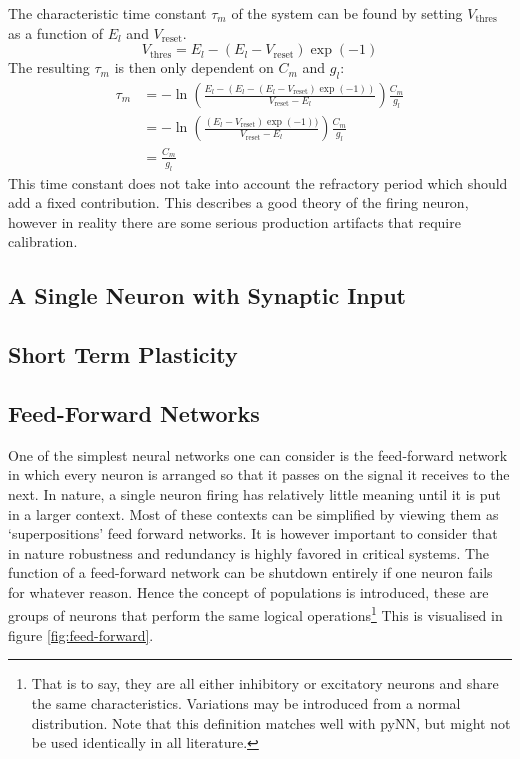\documentclass[10pt,a4paper]{article}
\begin{document}
The characteristic time constant $\tau_m$ of the system can be found by setting
$V_\text{thres}$ as a function of $E_l$ and $V_\text{reset}$.
\[
    V_\text{thres} = E_l - (E_l - V_\text{reset})\exp(-1)
\]
The resulting $\tau_m$ is then only dependent on $C_m$ and $g_l$:
\begin{align*}
    \tau_m &= -\ln(\frac{E_l - (E_l - (E_l - V_\text{reset})\exp(-1))}{V_\text{reset} - E_l}) \frac{C_m}{g_l}\\
           &= -\ln(\frac{(E_l - V_\text{reset})\exp(-1))}{V_\text{reset} - E_l})\frac{C_m}{g_l} \\
           &= \frac{C_m}{g_l}
\end{align*}
This time constant does not take into account the refractory period which should
add a fixed contribution. This describes a good theory of the firing  neuron,
however in reality there are some serious production artifacts that require
calibration.

\subsection{A Single Neuron with Synaptic Input}

\subsection{Short Term Plasticity}

\subsection{Feed-Forward Networks}
One of the simplest neural networks one can consider is the feed-forward network
in which every neuron is arranged so that it passes on the signal it receives to
the next. In nature, a single neuron firing has relatively little meaning until
it is put in a larger context. Most of these contexts can be simplified by
viewing them as `superpositions' feed forward networks. It is however important
to consider that in nature robustness and redundancy is highly favored in
critical systems. The function of a feed-forward network can be shutdown
entirely if one neuron fails for whatever reason. Hence the concept of
populations is introduced, these are groups of neurons that perform the same
logical operations\footnote{That is to say, they are all either inhibitory or
excitatory neurons and share the same characteristics. Variations may be
introduced from a normal distribution. Note that this definition matches well
with pyNN, but might not be used identically in all literature.} This is
visualised in figure \ref{fig:feed-forward}.
\end{document}
